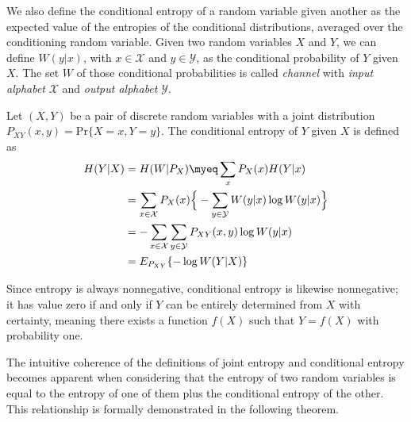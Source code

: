 \noindent We also define the conditional entropy of a random variable given another as the expected value of the entropies of the conditional distributions, averaged over the conditioning random variable. Given two random variables $X$ and $Y$, we can define $W(y|x)$, with $x \in \mathcal{X}$ and $y \in \mathcal{Y}$, as the conditional probability of $Y$ given $X$. The set $W$ of those conditional probabilities is called \emph{channel} with \emph{input alphabet} $\mathcal{X}$ and \emph{output alphabet} $\mathcal{Y}$.

\begin{definition}\label{def:conditional_entropy}
    Let $(X,Y)$ be a pair of discrete random variables with a joint distribution $P_{XY}(x,y) = \text{Pr}\{X=x,Y=y\}$. The conditional entropy of $Y$ given $X$ is defined as
    \begin{align}
        H(Y|X) &= H(W | P_X) \myeq \sum_x P_X(x)H(Y|x) \\
        &= \sum_{x \in \mathcal{X}} P_X(x) \Big\{ -\sum_{y \in \mathcal{Y}} W(y|x) \log W(y|x) \Big\} \\
        &= -\sum_{x\in\mathcal{X}}\sum_{y\in\mathcal{Y}} P_{XY}(x,y)\log W(y|x) \\
        &= E_{P_{XY}} \{ -\log W(Y|X) \}
    \end{align}
\end{definition}
Since entropy is always nonnegative, conditional entropy is likewise nonnegative; it has value zero if and only if $Y$ can be entirely determined from $X$ with certainty, meaning there exists a function $f(X)$ such that $Y = f(X)$ with probability one. \vspace*{0.4cm}

\noindent The intuitive coherence of the definitions of joint entropy and conditional entropy becomes apparent when considering that the entropy of two random variables is equal to the entropy of one of them plus the conditional entropy of the other. This relationship is formally demonstrated in the following theorem.


